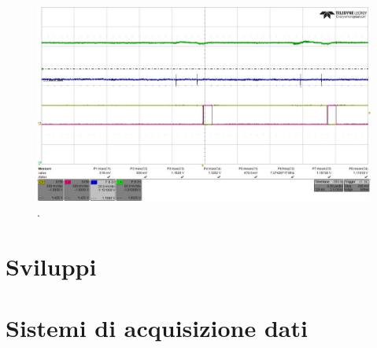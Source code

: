 \begin{figure}
\centering
\includegraphics[scale=.3]{Immagini/alllin2}
\caption{.}
\label{alllin2}
\end{figure}


\section{Sviluppi}


\section{Sistemi di acquisizione dati}

